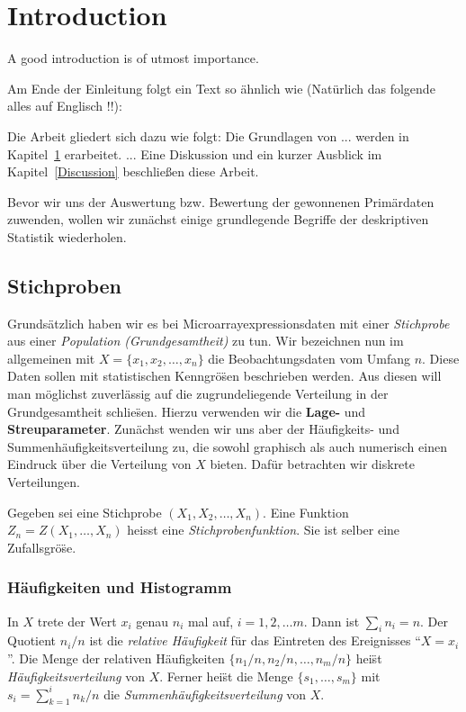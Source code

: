 
\chapter{Introduction}\label{Introduction}

A good introduction is of utmost importance.


\medskip
Am Ende der Einleitung folgt ein Text so \"ahnlich wie (Nat\"urlich das folgende alles auf Englisch !!):

Die Arbeit gliedert sich dazu wie folgt: Die Grundlagen von ...
werden in Kapitel~\ref{Introduction} erarbeitet. 
...
Eine
Diskussion und ein kurzer Ausblick im
Kapitel~\ref{Discussion} beschlie{\ss}en diese Arbeit.

Bevor wir uns der Auswertung bzw. Bewertung der gewonnenen Prim\"ardaten zuwenden, wollen wir zun\"achst einige grundlegende Begriffe der deskriptiven Statistik wiederholen.
\section{Stichproben}

Grunds\"atzlich haben wir es bei Microarrayexpressionsdaten mit einer {\em Stichprobe} aus einer {\em Population (Grundgesamtheit)} zu tun.   
Wir bezeichnen nun im allgemeinen mit $X=\{x_1,x_2,\ldots,x_n\}$ die Beobachtungsdaten vom Umfang $n$. 
Diese Daten sollen mit statistischen Kenngr\"o\"sen beschrieben werden. Aus diesen will man m\"oglichst zuverl\"assig auf die zugrundeliegende Verteilung in der Grundgesamtheit schlie\"sen. Hierzu verwenden wir die {\bf Lage-} und {\bf Streuparameter}. Zun\"achst wenden wir uns aber der H\"aufigkeits- und Summenh\"aufigkeitsverteilung zu, die sowohl graphisch als auch numerisch einen Eindruck \"uber die Verteilung von $X$ bieten. Daf\"ur betrachten wir diskrete Verteilungen.

Gegeben sei eine Stichprobe $(X_1,X_2,\ldots,X_n)$. Eine Funktion $Z_n=Z(X_1,\ldots,X_n)$ heisst eine {\em Stichprobenfunktion}. Sie ist selber eine Zufallsgr\"o\"se.

\subsection{H\"aufigkeiten und Histogramm}
In $X$ trete der Wert $x_i$ genau $n_i$ mal auf, $i=1,2,\ldots m$. Dann ist $\sum_i n_i = n$. Der Quotient $n_i/n$ ist die {\em relative H\"aufigkeit} f\"ur das Eintreten des Ereignisses ``$X=x_i$''.
Die Menge der relativen H\"aufigkeiten $\{n_1/n,n_2/n,\ldots, n_m/n\}$ hei\"st {\em H\"aufigkeitsverteilung} von $X$. Ferner hei\"st die Menge $\{s_1,\ldots,s_m\}$ mit $s_i=\sum_{k=1}^{i}n_k/n$ die {\em Summenh\"aufigkeitsverteilung} von $X$.

